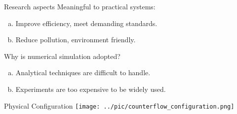 		\begin{xframe}{Research aspects}
			Meaningful to practical systems:
			\begin{enumerate}[(a)]
				\item 
					Improve efficiency, meet demanding standards.
				\item
					Reduce pollution, environment friendly.
			\end{enumerate}

			Why is numerical simulation adopted?
			\begin{enumerate}[(a)]
				\item 
				Analytical techniques are difficult to handle.
				\item
				Experiments are too expensive to be widely used.
			\end{enumerate}
		\end{xframe}
			
		\begin{xframe}{Physical Configuration}
			\texttt{[image: ../pic/counterflow\_configuration.png]}	
		\end{xframe}


{
\begin{frame}[plain]

\end{frame}
}


